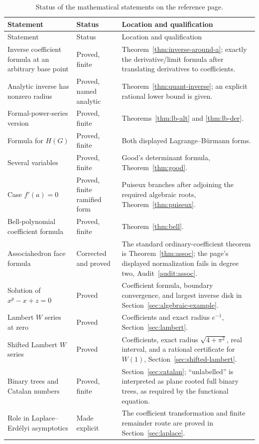 \documentclass[11pt]{article}
\theoremstyle{definition}
\begin{document}
\begin{longtable}{>{\raggedright\arraybackslash}p{}
                  >{\raggedright\arraybackslash}p{}
                  >{\raggedright\arraybackslash}p{}}
\caption{Status of the mathematical statements on the reference page.}
\label{tab:audit}\\
\toprule
Statement & Status & Location and qualification\\
\midrule
\endfirsthead
\toprule
Statement & Status & Location and qualification\\
\midrule
\endhead
Inverse coefficient formula at an arbitrary base point & Proved, finite &
Theorem~\ref{thm:inverse-around-a}; exactly the derivative/limit formula after
translating derivatives to coefficients.\\
Analytic inverse has nonzero radius & Proved, named analytic &
Theorem~\ref{thm:quant-inverse}; an explicit rational lower bound is given.\\
Formal-power-series version & Proved, finite &
Theorems~\ref{thm:lb-alt} and \ref{thm:lb-der}.\\
Formula for \(H(G)\) & Proved, finite &
Both displayed Lagrange--B\"urmann forms.\\
Several variables & Proved, finite &
Good's determinant formula, Theorem~\ref{thm:good}.\\
Case \(f'(a)=0\) & Proved, finite ramified form &
Puiseux branches after adjoining the required algebraic roots,
Theorem~\ref{thm:puiseux}.\\
Bell-polynomial coefficient formula & Proved, finite &
Theorem~\ref{thm:bell}.\\
Associahedron face formula & Corrected and proved &
The standard ordinary-coefficient theorem is
Theorem~\ref{thm:assoc}; the page's displayed normalization fails in degree two,
Audit~\ref{audit:assoc}.\\
Solution of \(x^p-x+z=0\) & Proved &
Coefficient formula, boundary convergence, and largest inverse disk in
Section~\ref{sec:algebraic-example}.\\
Lambert \(W\) series at zero & Proved &
Coefficients and exact radius \(e^{-1}\), Section~\ref{sec:lambert}.\\
Shifted Lambert \(W\) series & Proved &
Coefficients, exact radius \(\sqrt{4+\pi^2}\), real interval, and a rational
certificate for \(W(1)\), Section~\ref{sec:shifted-lambert}.\\
Binary trees and Catalan numbers & Proved, finite &
Section~\ref{sec:catalan}; ``unlabelled'' is interpreted as plane rooted full
binary trees, as required by the functional equation.\\
Role in Laplace--Erd\'elyi asymptotics & Made explicit &
The coefficient transformation and finite remainder route are proved in
Section~\ref{sec:laplace}.\\
\bottomrule
\end{longtable}
\end{document}
